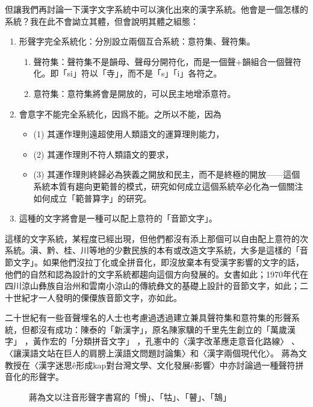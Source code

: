 \documentclass[a5paper, 12pt, openany]{book} %
\begin{document}
但讓我們再討論一下漢字文字系統中可以演化出來的漢字系統。他會是一個怎樣的系統？我在此不會詏立其體，但會說明其體之組態：

\begin{enumerate}
\item 形聲字完全系統化：分別設立兩個互合系統：意符集、聲符集。
\begin{enumerate}
	\item 聲符集：聲符集不是韻母、聲母分開符化，而是一個聲+韻組合一個聲符化。即「si」符以「寺」，而不是「s」「i」各符之。
	\item 意符集：意符集將會是開放的，可以民主地增添意符。
\end{enumerate}

\item 會意字不能完全系統化，因爲不能。之所以不能，因為
\begin{itemize}
	\item (1) 其運作理則遠超使用人類語文的運算理則能力，
	\item (2) 其運作理則不符人類語文的要求，
	\item (3) 其運作理則終歸必為狹義之開放和民主，而不是終極的開放——這個系統本質有趨向更範普的模式，研究如何成立這個系統卒必化為一個關注如何成立「範普算字」的研究。
\end{itemize}

\item 這種的文字將會是一種可以配上意符的「音節文字」。
\end{enumerate}


這樣的文字系統，某程度已經出現，但他們都沒有添上那個可以自由配上意符的次系統。滇、黔、桂、川等地的少數民族的本有或改造文字系統，大多是這樣的「音節文字」。如果他們沒拉丁化或全拼音化，即沒放棄本有受漢字影響的文字的話，他們的自然和認為設計的文字系統都趨向這個方向發展的。女書如此；1970年代在四川涼山彝族自治州和雲南小涼山的傳統彝文的基礎上設計的音節文字，如此；二十世紀才一人發明的傈僳族音節文字，亦如此。 

二十世紀有一些音聲埋名的人士也考慮過透過建立兼具聲符集和意符集的形聲系統，但都沒有成功：陳泰的「新漢字」，原名陳家驥的千里先生創立的「萬歲漢字」 ，黃作宏的「分類拼音文字」 ，孔憲中的〈漢字改革應走意音化路線〉 、〈讓漢語文站在巨人的肩膀上漢語文問題討論集〉和〈漢字兩個現代化〉。 蔣為文教授在〈漢字迷思ê形成kap對台灣文學、文化發展ê影響〉中亦討論過一種聲符拼音化的形聲字。 


\begin{figure}[h]
\centering
\caption{蔣為文以注音形聲字書寫的「愲」、「牯」、「瞽」、「鵠」}
\end{figure}
\end{document}

